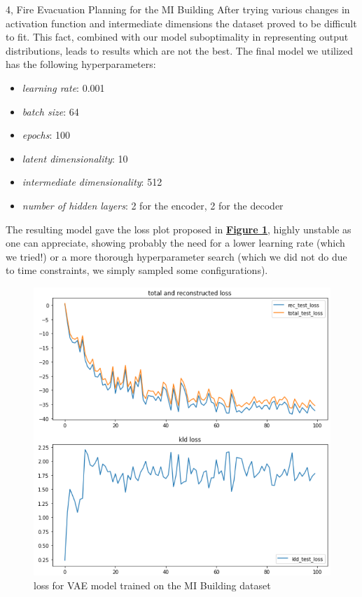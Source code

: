 \documentclass[10pt,a4paper]{article}
\begin{document}
\begin{task}{4, Fire Evacuation Planning for the MI Building}
After trying various changes in activation function and intermediate dimensions the dataset proved to be difficult to fit. This fact, combined with our model suboptimality in representing output distributions, leads to results which are not the best.
The final model we utilized has the following hyperparameters:
\begin{itemize}
    \item \textit{learning rate}: 0.001 
    \item \textit{batch size}: 64
    \item \textit{epochs}: 100
    \item \textit{latent dimensionality}: 10
    \item \textit{intermediate dimensionality}: 512
    \item \textit{number of hidden layers}: 2 for the encoder, 2 for the decoder
\end{itemize}

The resulting model gave the loss plot proposed in \textbf{\hyperref[fig:mi-loss]{Figure \ref{fig:mi-loss}}}, highly unstable as one can appreciate, showing probably the need for a lower learning rate (which we tried!) or a more thorough hyperparameter search (which we did not do due to time constraints, we simply sampled some configurations).  
\begin{figure}[H]
    \centering
    \includegraphics[scale=0.4]{images/loss-mi.png}
    \caption{loss for VAE model trained on the MI Building dataset}
    \label{fig:mi-loss}
\end{figure}


\end{task}
\end{document}
